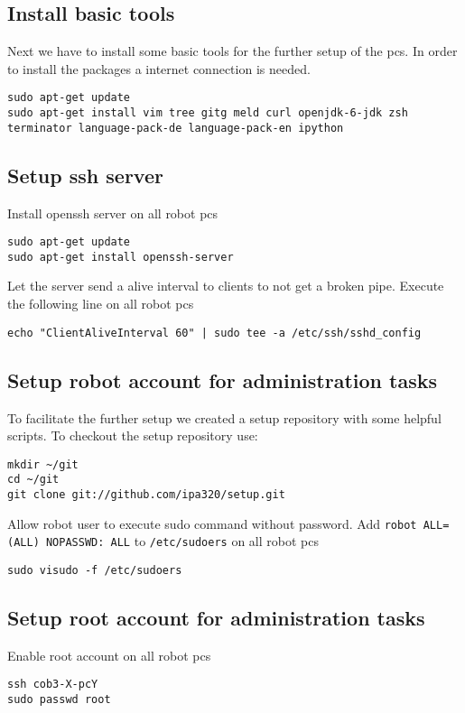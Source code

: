 \subsection{Install basic tools}
Next we have to install some basic tools for the further setup of the pcs. In order to install the packages a internet connection is needed.

\begin{lstlisting}
sudo apt-get update
sudo apt-get install vim tree gitg meld curl openjdk-6-jdk zsh terminator language-pack-de language-pack-en ipython
\end{lstlisting}

\subsection{Setup ssh server}
Install openssh server on all robot pcs
\begin{lstlisting}
sudo apt-get update
sudo apt-get install openssh-server
\end{lstlisting}
Let the server send a alive interval to clients to not get a broken pipe. Execute the following line on all robot pcs
\begin{lstlisting}
echo "ClientAliveInterval 60" | sudo tee -a /etc/ssh/sshd_config
\end{lstlisting}

\subsection{Setup robot account for administration tasks}
To facilitate the further setup we created a setup repository with some helpful scripts. To checkout the setup repository use:

\begin{lstlisting}
mkdir ~/git
cd ~/git
git clone git://github.com/ipa320/setup.git
\end{lstlisting}


Allow robot user to execute sudo command without password. Add \texttt{robot ALL=(ALL) NOPASSWD: ALL} to \texttt{/etc/sudoers} on all robot pcs
\begin{lstlisting}
sudo visudo -f /etc/sudoers
\end{lstlisting}

\subsection{Setup root account for administration tasks} \label{sec:root_user}
Enable root account on all robot pcs
\begin{lstlisting}
ssh cob3-X-pcY
sudo passwd root
\end{lstlisting}

